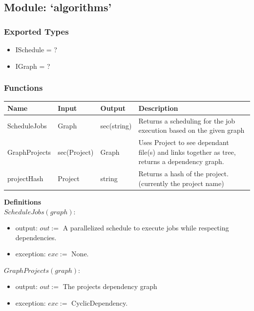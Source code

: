 \documentclass[11pt]{article}
\begin{document}
\subsection{Module: `algorithms'}
\label{mod:algorithms}
\subsubsection{Exported Types}
\begin{itemize}
\item ISchedule = ?
\item IGraph = ?
\end{itemize}

\subsubsection{Functions}
\begin{tabular}{l | l | l | p{7cm} }
  \textbf{Name} & \textbf{Input} & \textbf{Output} & \textbf{Description} \\
  \hline
  ScheduleJobs & Graph & sec(string) & Returns a scheduling for the job execution based on the given graph \\
  \hline
  GraphProjects & sec(Project) & Graph & Uses Project to see dependant file(s) and links together as tree, returns
                                         a dependency graph. \\
  \hline
  projectHash & Project & string & Returns a hash of the project. (currently the project name) \\
\end{tabular}

\vspace{2em}
\textbf{Definitions}\\

$ScheduleJobs(graph):$
\begin{itemize}
\item output: $out :=$ A parallelized schedule to execute jobs while
  respecting dependencies.
\item exception: $exc :=$ None.
\end{itemize}

\vspace{1em}
$GraphProjects(graph):$
\begin{itemize}
\item output: $out :=$ The projects dependency graph
\item exception: $exc :=$ CyclicDependency.
\end{itemize}
\end{document}
